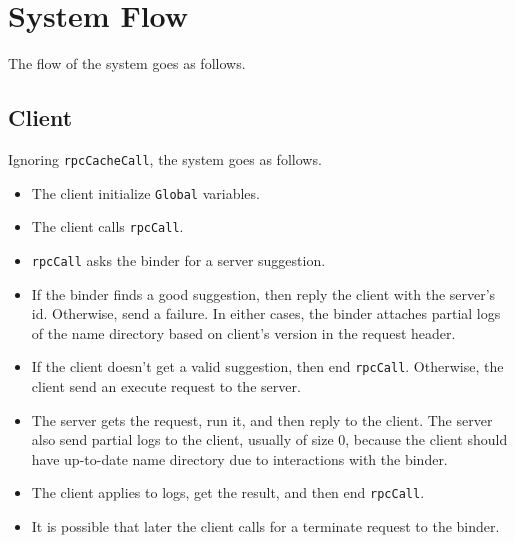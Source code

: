 \section{System Flow}
The flow of the system goes as follows.

\subsection{Client}
Ignoring {\tt rpcCacheCall}, the system goes as follows.
\begin{itemize}
\item
The client initialize {\tt Global} variables.
\item
The client calls {\tt rpcCall}.
\item
{\tt rpcCall} asks the binder for a server suggestion.
\item
If the binder finds a good suggestion, then reply the client with the server's id.
Otherwise, send a failure.
In either cases, the binder attaches partial logs of the name directory based on client's version in the request header.
\item
If the client doesn't get a valid suggestion, then end {\tt rpcCall}.
Otherwise, the client send an execute request to the server.
\item
The server gets the request, run it, and then reply to the client.
The server also send partial logs to the client, usually of size 0, because the client should have up-to-date name directory due to interactions with the binder.
\item
The client applies to logs, get the result, and then end {\tt rpcCall}.
\item
It is possible that later the client calls for a terminate request to the binder.
\end{itemize}

